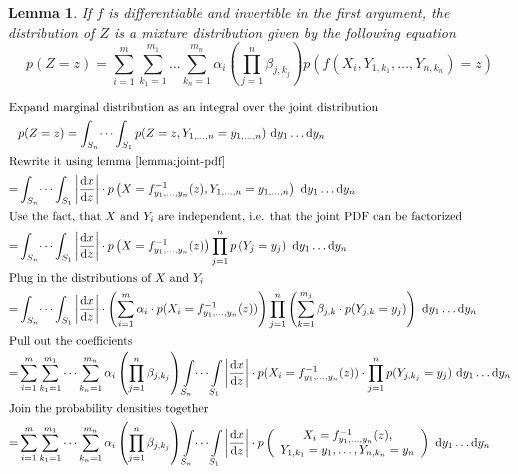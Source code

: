 \documentclass[11pt,a4paper]{book}
\newtheorem{lemma}{Lemma}
\newcommand{\ontopof}[2]{
  \begin{array}{c}
    #1,\\#2
  \end{array}
}
\begin{document}
\begin{lemma}
  \label{lemma:mixture}
  If $f$ is differentiable and invertible in the first argument, the
  distribution of $Z$ is a mixture distribution given by the following equation
  \begin{equation*}
    p(Z = z) = \sum_{i = 1}^{m} \sum_{k_{1} = 1}^{m_{1}} \dots \sum_{k_{n} = 1}^{m_{n}} \alpha_{i} \left( \prod_{j = 1}^{n} \beta_{j,k_{j}} \right) p(f(X_{i}, Y_{1,k_{1}}, \dots, Y_{n,k_{n}}) = z)
  \end{equation*}
\end{lemma}
\begin{proof2}
  \begin{align*}
    \intertext{Expand marginal distribution as an integral over the joint distribution}
    & p(Z = z) = \int_{S_{n}} \dots \int_{S_{1}} p(Z = z, Y_{1, \dots, n} = y_{1, \dots, n})~\mathrm{d}y_{1}\dots \mathrm{d}y_{n}\\
    \intertext{Rewrite it using lemma \ref{lemma:joint-pdf}}
    = & \int_{S_{n}} \dots \int_{S_{1}} \left| \frac{\mathrm{d}x}{\mathrm{d}z} \right| \cdot p\left(X = f_{y_{1}, \dots, y_{n}}^{-1}(z), Y_{1, \dots, n} = y_{1, \dots, n}\right)~\mathrm{d}y_{1}\dots \mathrm{d}y_{n}\\
    \intertext{Use the fact, that $X$ and $Y_{i}$ are independent, i.e. that the joint PDF can be factorized}
    = & \int_{S_{n}} \dots \int_{S_{1}} \left| \frac{\mathrm{d}x}{\mathrm{d}z} \right| \cdot p\left(X = f_{y_{1}, \dots, y_{n}}^{-1}(z)\right) \prod_{j = 1}^{n} p\left(Y_{j} = y_{j}\right)~\mathrm{d}y_{1}\dots \mathrm{d}y_{n}\\
    \intertext{Plug in the distributions of $X$ and $Y_{i}$}
    = & \int_{S_{n}} \dots \int_{S_{1}} \left| \frac{\mathrm{d}x}{\mathrm{d}z} \right| \cdot \left(\sum_{i = 1}^{m} \alpha_{i} \cdot p(X_{i} = f_{y_{1}, \dots, y_{n}}^{-1}(z))\right) \prod_{j = 1}^{n} \left(\sum_{k = 1}^{m_{j}} \beta_{j,k} \cdot p(Y_{j,k} = y_{j})\right)~\mathrm{d}y_{1}\dots \mathrm{d}y_{n}\\
    \intertext{Pull out the coefficients}
    = & \sum_{i = 1}^{m} \sum_{k_{1} = 1}^{m_{1}} \dots \sum_{k_{n} = 1}^{m_{n}} \alpha_{i} \left( \prod_{j = 1}^{n} \beta_{j,k_{j}} \right) \int\limits_{S_{n}} \dots \int\limits_{S_{1}} \left| \frac{\mathrm{d}x}{\mathrm{d}z} \right| \cdot p(X_{i} = f_{y_{1}, \dots, y_{n}}^{-1}(z)) \cdot \prod_{j = 1}^{n} p(Y_{j,k_{j}} = y_{j})~\mathrm{d}y_{1}\dots \mathrm{d}y_{n}\\
    \intertext{Join the probability densities together}
    = & \sum_{i = 1}^{m} \sum_{k_{1} = 1}^{m_{1}} \dots \sum_{k_{n} = 1}^{m_{n}} \alpha_{i} \left( \prod_{j = 1}^{n} \beta_{j,k_{j}} \right) \int\limits_{S_{n}} \dots \int\limits_{S_{1}} \left| \frac{\mathrm{d}x}{\mathrm{d}z} \right| \cdot p\left( \ontopof{X_{i} = f_{y_{1}, \dots, y_{n}}^{-1}(z)}{Y_{1,k_{1}} = y_{1}, \dots, Y_{n,k_{n}} = y_{n}} \right)~\mathrm{d}y_{1}\dots \mathrm{d}y_{n}\\

\end{align*}
\end{proof2}
\end{document}
